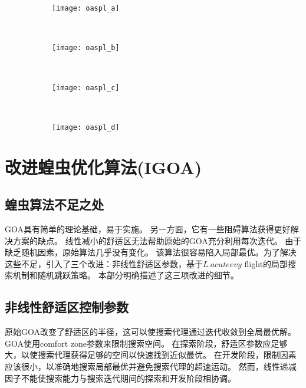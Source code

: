 \begin{figure}[!htbp]
    \centering
    \begin{subfigure}[b]{0.35\textwidth}
      \texttt{[image: oaspl\_a]}
      \caption{}
      \label{fig:oaspl_a}
    \end{subfigure}%
    ~%
    \begin{subfigure}[b]{0.35\textwidth}
      \texttt{[image: oaspl\_b]}
      \caption{}
      \label{fig:oaspl_b}
    \end{subfigure}
    \\%
    \begin{subfigure}[b]{0.35\textwidth}
      \texttt{[image: oaspl\_c]}
      \caption{}
      \label{fig:oaspl_c}
    \end{subfigure}%
    ~%
    \begin{subfigure}[b]{0.35\textwidth}
      \texttt{[image: oaspl\_d]}
      \caption{}
      \label{fig:oaspl_d}
    \end{subfigure}
    \label{fig:oaspl}
\end{figure}
\section{改进蝗虫优化算法(IGOA)}\label{sec:task_scheduling_IGOA}
\subsection{蝗虫算法不足之处}
GOA具有简单的理论基础，易于实施。 另一方面，它有一些阻碍算法获得更好解决方案的缺点。
线性减小的舒适区无法帮助原始的GOA充分利用每次迭代。 由于缺乏随机因素，原始算法几乎没有变化。 该算法很容易陷入局部最优。为了解决这些不足，引入了三个改进：非线性舒适区参数，基于$ L \ acute {e} vy $ flight的局部搜索机制和随机跳跃策略。 本部分明确描述了这三项改进的细节。
\subsection{非线性舒适区控制参数}
原始GOA改变了舒适区的半径，这可以使搜索代理通过迭代收敛到全局最优解。 GOA使用comfort zone参数来限制搜索空间。 在探索阶段，舒适区参数应足够大，以使搜索代理获得足够的空间以快速找到近似最优。 在开发阶段，限制因素应该很小，以准确地搜索局部最优并避免搜索代理的超速运动。 然而，线性递减因子不能使搜索能力与搜索迭代期间的探索和开发阶段相协调。

